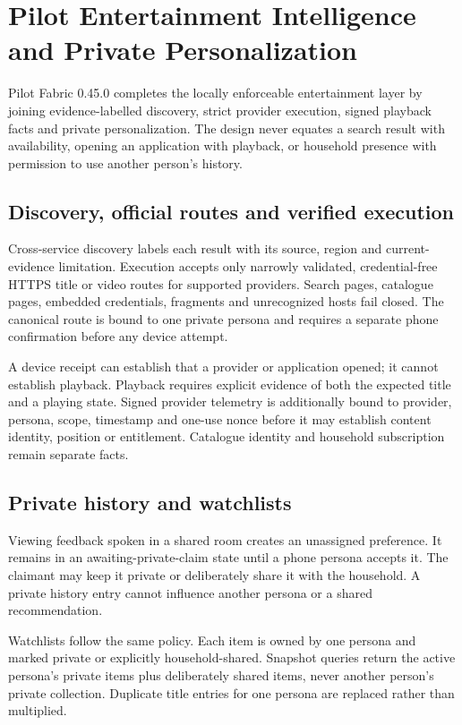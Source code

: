\section{Pilot Entertainment Intelligence and Private Personalization}
\label{sec:pilot-entertainment-intelligence}

Pilot Fabric 0.45.0 completes the locally enforceable entertainment layer by joining
evidence-labelled discovery, strict provider execution, signed playback facts and private
personalization.  The design never equates a search result with availability, opening an
application with playback, or household presence with permission to use another person's
history.

\subsection{Discovery, official routes and verified execution}

Cross-service discovery labels each result with its source, region and current-evidence
limitation.  Execution accepts only narrowly validated, credential-free HTTPS title or
video routes for supported providers.  Search pages, catalogue pages, embedded credentials,
fragments and unrecognized hosts fail closed.  The canonical route is bound to one private
persona and requires a separate phone confirmation before any device attempt.

A device receipt can establish that a provider or application opened; it cannot establish
playback.  Playback requires explicit evidence of both the expected title and a playing
state.  Signed provider telemetry is additionally bound to provider, persona, scope,
timestamp and one-use nonce before it may establish content identity, position or
entitlement.  Catalogue identity and household subscription remain separate facts.

\subsection{Private history and watchlists}

Viewing feedback spoken in a shared room creates an unassigned preference.  It remains in
an awaiting-private-claim state until a phone persona accepts it.  The claimant may keep it
private or deliberately share it with the household.  A private history entry cannot
influence another persona or a shared recommendation.

Watchlists follow the same policy.  Each item is owned by one persona and marked private or
explicitly household-shared.  Snapshot queries return the active persona's private items
plus deliberately shared items, never another person's private collection.  Duplicate
title entries for one persona are replaced rather than multiplied.

